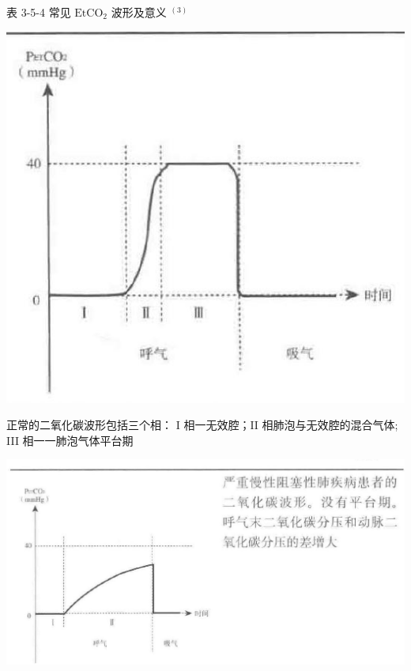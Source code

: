 \documentclass[10pt]{article}
\begin{document}
表 3-5-4 常见 $\mathrm{EtCO}_{2}$ 波形及意义 ${ }^{(3)}$

\begin{center}
\includegraphics[max width=\textwidth]{2024_07_05_645bb794a4d4f32ee0c8g-098}
\end{center}

正常的二氧化碳波形包括三个相： I 相一无效腔；II 相肺泡与无效腔的混合气体; III 相一一肺泡气体平台期

\begin{center}
\includegraphics[max width=\textwidth]{2024_07_05_645bb794a4d4f32ee0c8g-099(2)}
\end{center}
\end{document}
